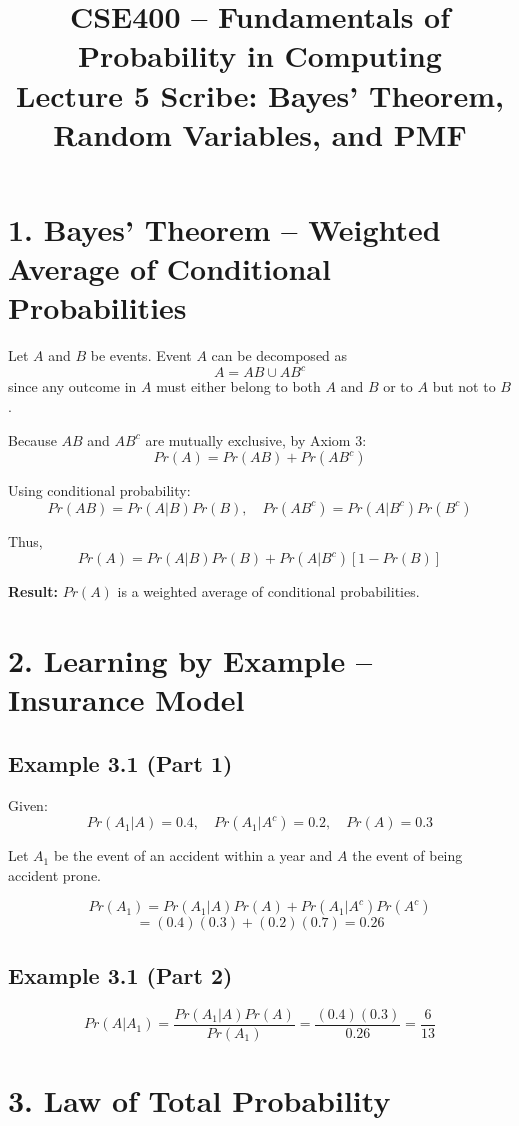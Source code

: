 \documentclass[12pt]{article}
\title{CSE400 -- Fundamentals of Probability in Computing\\
Lecture 5 Scribe: Bayes’ Theorem, Random Variables, and PMF}
\author{}
\date{}
\begin{document}
\maketitle

\section*{1. Bayes’ Theorem -- Weighted Average of Conditional Probabilities}

Let $A$ and $B$ be events. Event $A$ can be decomposed as
\[
A = AB \cup AB^c
\]
since any outcome in $A$ must either belong to both $A$ and $B$ or to $A$ but not to $B$.

Because $AB$ and $AB^c$ are mutually exclusive, by Axiom 3:
\[
Pr(A) = Pr(AB) + Pr(AB^c)
\]

Using conditional probability:
\[
Pr(AB) = Pr(A|B)Pr(B), \quad
Pr(AB^c) = Pr(A|B^c)Pr(B^c)
\]

Thus,
\[
Pr(A) = Pr(A|B)Pr(B) + Pr(A|B^c)[1 - Pr(B)]
\]

\textbf{Result:} $Pr(A)$ is a weighted average of conditional probabilities.

\section*{2. Learning by Example -- Insurance Model}

\subsection*{Example 3.1 (Part 1)}

Given:
\[
Pr(A_1|A)=0.4, \quad Pr(A_1|A^c)=0.2, \quad Pr(A)=0.3
\]

Let $A_1$ be the event of an accident within a year and $A$ the event of being accident prone.

\[
Pr(A_1)=Pr(A_1|A)Pr(A)+Pr(A_1|A^c)Pr(A^c)
\]
\[
= (0.4)(0.3) + (0.2)(0.7) = 0.26
\]

\subsection*{Example 3.1 (Part 2)}

\[
Pr(A|A_1)=\frac{Pr(A_1|A)Pr(A)}{Pr(A_1)}
= \frac{(0.4)(0.3)}{0.26} = \frac{6}{13}
\]

\section*{3. Law of Total Probability}
\end{document}

